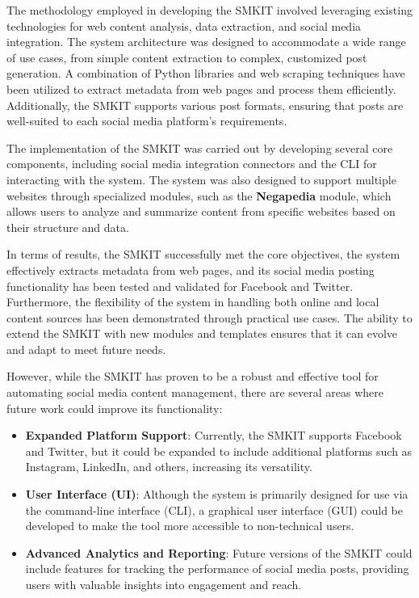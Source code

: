 The methodology employed in developing the SMKIT involved leveraging existing technologies for web content analysis, data extraction, and social media integration. The system architecture was designed to accommodate a wide range of use cases, from simple content extraction to complex, customized post generation. A combination of Python libraries and web scraping techniques have been utilized to extract metadata from web pages and process them efficiently. Additionally, the SMKIT supports various post formats, ensuring that posts are well-suited to each social media platform's requirements.

The implementation of the SMKIT was carried out by developing several core components, including social media integration connectors and the CLI for interacting with the system. The system was also designed to support multiple websites through specialized modules, such as the \textbf{Negapedia} module, which allows users to analyze and summarize content from specific websites based on their structure and data.

In terms of results, the SMKIT successfully met the core objectives, the system effectively extracts metadata from web pages, and its social media posting functionality has been tested and validated for Facebook and Twitter. Furthermore, the flexibility of the system in handling both online and local content sources has been demonstrated through practical use cases. The ability to extend the SMKIT with new modules and templates ensures that it can evolve and adapt to meet future needs.

However, while the SMKIT has proven to be a robust and effective tool for automating social media content management, there are several areas where future work could improve its functionality:

\begin{itemize}
    \item \textbf{Expanded Platform Support}: Currently, the SMKIT supports Facebook and Twitter, but it could be expanded to include additional platforms such as Instagram, LinkedIn, and others, increasing its versatility.
    \item \textbf{User Interface (UI)}: Although the system is primarily designed for use via the command-line interface (CLI), a graphical user interface (GUI) could be developed to make the tool more accessible to non-technical users.
    \item \textbf{Advanced Analytics and Reporting}: Future versions of the SMKIT could include features for tracking the performance of social media posts, providing users with valuable insights into engagement and reach.
\end{itemize}

